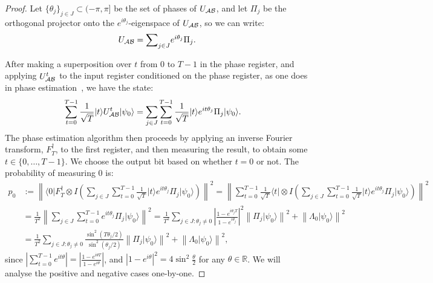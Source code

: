 \documentclass{theoretics}
\def\ket#1{{\lvert}#1\rangle}
\def\bra#1{{\langle}#1\rvert}
\renewcommand{\>}{\rangle}
\newcommand{\<}{\langle}
\renewcommand{\(}{\left(}
\renewcommand{\)}{\right)}
\def\abs#1{\left| #1 \right|}
\def\norm#1{\left\| #1 \right\|}
\begin{document}
\begin{proof}
Let $\{\theta_j\}_{j\in J}\subset (-\pi,\pi]$ be the set of phases of $U_{\cal AB}$, and let $\Pi_j$ be the orthogonal projector onto the $e^{i\theta_j}$-eigenspace of $U_{\cal AB}$, so we can write:
\begin{equation*}
U_{\cal AB} = \textstyle{\displaystyle\sum}_{j\in J} e^{i\theta_j}\Pi_j.
\end{equation*}

After making a superposition over $t$ from $0$ to $T-1$ in the phase register, and applying $U_{\cal AB}^t$ to the input register conditioned on the phase register,  as one does in phase estimation~\cite{kitaev1996PhaseEst}, we have the state:
\begin{equation*}
\begin{split}
\sum_{t=0}^{T-1}\frac{1}{\sqrt{T}}\ket{t}U_{\cal AB}^t\ket{\psi_0} &=  \sum_{j\in J}\sum_{t=0}^{T-1}\frac{1}{\sqrt{T}}\ket{t}e^{it\theta_j}\Pi_j\ket{\psi_0}.
\end{split}
\end{equation*}
The phase estimation algorithm then proceeds by applying an inverse Fourier transform, $F_T^\dagger$, to the first register, and then measuring the result, to obtain some $t\in \{0,\dots,T-1\}$. We choose the output bit based on whether $t=0$ or not. The probability of measuring 0 is:
\begin{equation}
\begin{split}
p_0&:=  \norm{\bra{0}F_T^\dagger \otimes I\left( \sum_{j\in J} \sum_{t=0}^{T-1}\frac{1}{\sqrt{T}}\ket{t}e^{it\theta_j}\Pi_j\ket{\psi_0} \right)}^2 
= \norm{\sum_{t=0}^{T-1}\frac{1}{\sqrt{T}}\bra{t}\otimes I \left( \sum_{j\in J} \sum_{t=0}^{T-1}\frac{1}{\sqrt{T}}\ket{t}e^{it\theta_j}\Pi_j\ket{\psi_0} \right)}^2\\
&= \frac{1}{T^2}\norm{\sum_{j\in J}\sum_{t=0}^{T-1}e^{it\theta_j}\Pi_j\ket{\psi_0}}^2
= \frac{1}{T^2}\sum_{j\in J:\theta_j\neq 0}\left| \frac{1-e^{i\theta_j T}}{1-e^{i\theta_j}} \right|^2 \norm{\Pi_j\ket{\psi_0}}^2 + \norm{\Lambda_0\ket{\psi_0}}^2\\
&=\frac{1}{T^2}\sum_{j\in J:\theta_j\neq 0}\frac{\sin^2(T\theta_j/2)}{\sin^2(\theta_j/2)}\norm{\Pi_j\ket{\psi_0}}^2+\norm{\Lambda_0\ket{\psi_0}}^2,
\end{split}\label{eq:phase-prob}
\end{equation}
since $\abs{\sum_{t=0}^{T-1}e^{i t\theta}} = \abs{\frac{1-e^{i\theta T}}{1-e^{i\theta}}}$,
and $|1-e^{i\theta}|^2=4\sin^2\frac{\theta}{2}$ for any $\theta\in\mathbb{R}$.
We will analyse the positive and negative cases one-by-one. 


\end{proof}
\end{document}
